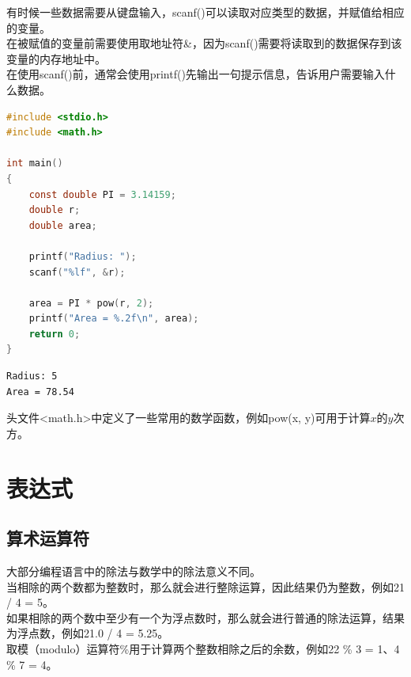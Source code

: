有时候一些数据需要从键盘输入，scanf()可以读取对应类型的数据，并赋值给相应的变量。\\

在被赋值的变量前需要使用取地址符\&，因为scanf()需要将读取到的数据保存到该变量的内存地址中。\\

在使用scanf()前，通常会使用printf()先输出一句提示信息，告诉用户需要输入什么数据。\\


\begin{lstlisting}[language=C]
#include <stdio.h>
#include <math.h>

int main()
{
	const double PI = 3.14159;
	double r;
	double area;

	printf("Radius: ");
	scanf("%lf", &r);

	area = PI * pow(r, 2);
	printf("Area = %.2f\n", area);
	return 0;
}
\end{lstlisting}

\begin{tcolorbox}
	\begin{verbatim}
Radius: 5
Area = 78.54
	\end{verbatim}
\end{tcolorbox}

头文件<math.h>中定义了一些常用的数学函数，例如pow(x, y)可用于计算$ x $的$ y $次方。\\

\newpage

\section{表达式}

\subsection{算术运算符}

大部分编程语言中的除法与数学中的除法意义不同。\\

当相除的两个数都为整数时，那么就会进行整除运算，因此结果仍为整数，例如21 / 4 = 5。\\

如果相除的两个数中至少有一个为浮点数时，那么就会进行普通的除法运算，结果为浮点数，例如21.0 / 4 = 5.25。\\

取模（modulo）运算符\%用于计算两个整数相除之后的余数，例如22 \% 3 = 1、4 \% 7 = 4。\\

